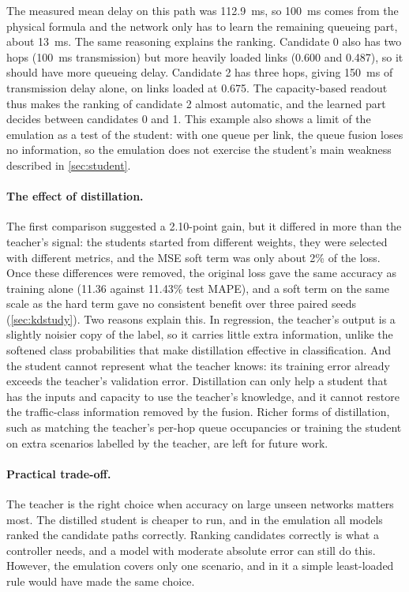 The measured mean delay on this path was 112.9~ms, so 100~ms comes from the physical formula and the network only has to learn the remaining queueing part, about 13~ms. The same reasoning explains the ranking. Candidate 0 also has two hops (100~ms transmission) but more heavily loaded links (0.600 and 0.487), so it should have more queueing delay. Candidate 2 has three hops, giving 150~ms of transmission delay alone, on links loaded at 0.675. The capacity-based readout thus makes the ranking of candidate 2 almost automatic, and the learned part decides between candidates 0 and 1. This example also shows a limit of the emulation as a test of the student: with one queue per link, the queue fusion loses no information, so the emulation does not exercise the student's main weakness described in \cref{sec:student}.

\paragraph{The effect of distillation.} The first comparison suggested a 2.10-point gain, but it differed in more than the teacher's signal: the students started from different weights, they were selected with different metrics, and the MSE soft term was only about 2\% of the loss. Once these differences were removed, the original loss gave the same accuracy as training alone (11.36 against 11.43\% test MAPE), and a soft term on the same scale as the hard term gave no consistent benefit over three paired seeds (\cref{sec:kdstudy}). Two reasons explain this. In regression, the teacher's output is a slightly noisier copy of the label, so it carries little extra information, unlike the softened class probabilities that make distillation effective in classification. And the student cannot represent what the teacher knows: its training error already exceeds the teacher's validation error. Distillation can only help a student that has the inputs and capacity to use the teacher's knowledge, and it cannot restore the traffic-class information removed by the fusion. Richer forms of distillation, such as matching the teacher's per-hop queue occupancies or training the student on extra scenarios labelled by the teacher, are left for future work.

\paragraph{Practical trade-off.} The teacher is the right choice when accuracy on large unseen networks matters most. The distilled student is cheaper to run, and in the emulation all models ranked the candidate paths correctly. Ranking candidates correctly is what a controller needs, and a model with moderate absolute error can still do this. However, the emulation covers only one scenario, and in it a simple least-loaded rule would have made the same choice.

